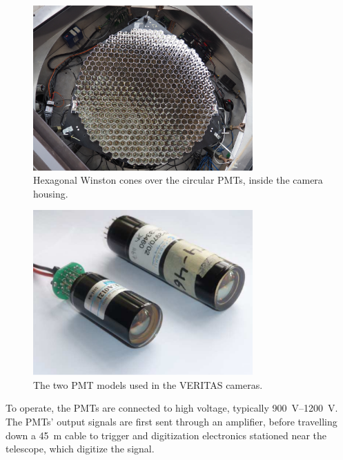 \begin{figure}[ht]
  \centering
  \includegraphics[width=0.75\textwidth]{images/winston_cones_t2}
  \caption[Winston Cones]{
    Hexagonal Winston cones over the circular PMTs, inside the camera housing.}
  \label{fig:winstcones}
\end{figure}


\begin{figure}[ht]
  \centering
  \includegraphics[width=0.75\textwidth]{images/pmt_models}
  \caption[PMT Models]{
    The two PMT models used in the VERITAS cameras.\cite{pmtmodels}}
  \label{fig:pmtmodels}
\end{figure}

To operate, the PMTs are connected to high voltage, typically \SIrange{900}{1200}{V}.
%
%
The PMTs' output signals are first sent through an amplifier, before travelling down a \nicetilde{}\SI{45}{m} cable to trigger and digitization electronics stationed near the telescope, which digitize the signal.

